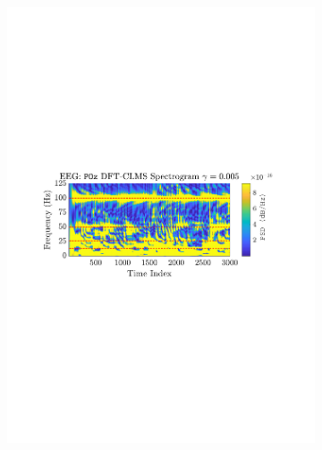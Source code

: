 \documentclass[12pt]{article}
\numberwithin{equation}{section}
\begin{document}
\begin{figure}[H]
				\begin{subfigure}{0.49\textwidth}
					\centering
					\includegraphics[trim={2.2cm 11.2cm 2.90cm  11.2cm}, clip, width=\textwidth]{../MATLAB/figures/q3_3d_fig03.pdf} 
					\captionsetup{justification=centering}
				\end{subfigure}
				\begin{subfigure}{0.49\textwidth}
					\centering

\end{subfigure}
\end{figure}
\end{document}
